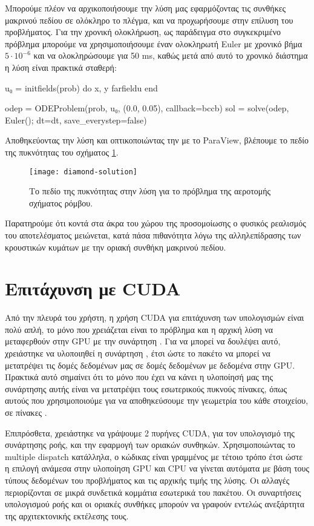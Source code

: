 Μπορούμε πλέον να αρχικοποιήσουμε την λύση μας εφαρμόζοντας τις συνθήκες μακρινού πεδίου σε ολόκληρο το πλέγμα, και να προχωρήσουμε στην επίλυση του προβλήματος. Για την χρονική ολοκλήρωση, ως παράδειγμα στο συγκεκριμένο πρόβλημα μπορούμε να χρησιμοποιήσουμε έναν ολοκληρωτή Euler με χρονικό βήμα $5 \cdot 10^{-6}$ και να ολοκληρώσουμε για 50 ms, καθώς μετά από αυτό το χρονικό διάστημα η λύση είναι πρακτικά σταθερή:

{\large
\begin{jllisting}[language=julia,style=jlcodestyle]
u₀ = initfields(prob) do x, y
	farfieldu
end

odep = ODEProblem(prob, u₀, (0.0, 0.05), callback=bccb)
sol = solve(odep, Euler(); dt=dt, save_everystep=false)
\end{jllisting}
}

Αποθηκεύοντας την λύση και οπτικοποιώντας την με το ParaView, βλέπουμε το πεδίο της πυκνότητας του σχήματος \ref{fig:diamond-solution}.

\begin{figure}[H]
    \centering
    \texttt{[image: diamond-solution]}
    \caption{Το πεδίο της πυκνότητας στην λύση για το πρόβλημα της αεροτομής σχήματος ρόμβου.}
    \label{fig:diamond-solution}
\end{figure}

Παρατηρούμε ότι κοντά στα άκρα του χώρου της προσομοίωσης ο φυσικός ρεαλισμός του αποτελέσματος μειώνεται, κατά πάσα πιθανότητα λόγω της αλληλεπίδρασης των κρουστικών κυμάτων με την οριακή συνθήκη μακρινού πεδίου.

\section{Επιτάχυνση με CUDA}

Από την πλευρά του χρήστη, η χρήση CUDA για επιτάχυνση των υπολογισμών είναι πολύ απλή, το μόνο που χρειάζεται είναι το πρόβλημα και η αρχική λύση να μεταφερθούν στην GPU με την συνάρτηση .
Για να μπορεί να δουλέψει αυτό, χρειάστηκε να υλοποιηθεί η συνάρτηση , έτσι ώστε το πακέτο  να μπορεί να μετατρέψει τις δομές δεδομένων μας σε δομές δεδομένων με δεδομένα στην GPU.
Πρακτικά αυτό σημαίνει ότι το μόνο που έχει να κάνει η υλοποίησή μας της συνάρτησης αυτής είναι να μετατρέψει τους εσωτερικούς πυκνούς πίνακες, όπως αυτούς που χρησιμοποιούμε για να αποθηκεύσουμε την γεωμετρία του κάθε στοιχείου, σε πίνακες .

Επιπρόσθετα, χρειάστηκε να γράψουμε 2 πυρήνες CUDA, για τον υπολογισμό της συνάρτησης ροής, και την εφαρμογή των οριακών συνθηκών.
Χρησιμοποιώντας το multiple dispatch κατάλληλα, ο κώδικας είναι γραμμένος με τέτοιο τρόπο έτσι ώστε η επιλογή ανάμεσα στην υλοποίηση GPU και CPU να γίνεται αυτόματα με βάση τους τύπους δεδομένων του προβλήματος και τις αρχικής τιμής της λύσης.
Οι αλλαγές περιορίζονται σε μικρά συνδετικά κομμάτια εσωτερικά του πακέτου.
Οι συναρτήσεις υπολογισμού ροής και οι οριακές συνθήκες μπορούν να γραφούν εντελώς ανεξάρτητα της αρχιτεκτονικής εκτέλεσης τους.

